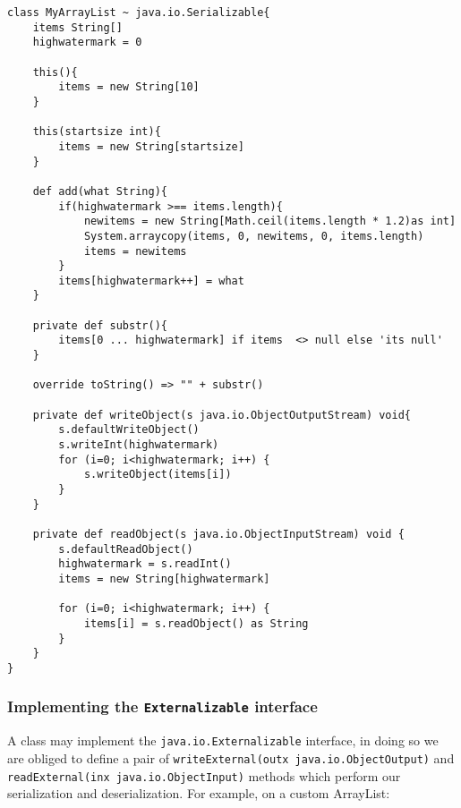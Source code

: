 \documentclass[conc-doc]{subfiles}
\begin{document}
\begin{lstlisting}
class MyArrayList ~ java.io.Serializable{
	items String[]
	highwatermark = 0
	
	this(){
		items = new String[10]
	}
	
	this(startsize int){
		items = new String[startsize]
	}
	
	def add(what String){
		if(highwatermark >== items.length){
			newitems = new String[Math.ceil(items.length * 1.2)as int]
			System.arraycopy(items, 0, newitems, 0, items.length)
			items = newitems
		}
		items[highwatermark++] = what
	}
	
	private def substr(){
		items[0 ... highwatermark] if items  <> null else 'its null'
	}
	
	override toString() => "" + substr()
	
	private def writeObject(s java.io.ObjectOutputStream) void{
		s.defaultWriteObject()
		s.writeInt(highwatermark)
		for (i=0; i<highwatermark; i++) {
			s.writeObject(items[i])
		}
	}
	
	private def readObject(s java.io.ObjectInputStream) void {
		s.defaultReadObject()
		highwatermark = s.readInt()
		items = new String[highwatermark] 
		
		for (i=0; i<highwatermark; i++) {
			items[i] = s.readObject() as String
		}
	}	
}
\end{lstlisting}

\subsubsection{Implementing the \lstinline{Externalizable} interface}
A class may implement the \lstinline{java.io.Externalizable} interface, in doing so we are obliged to define a pair of \lstinline{writeExternal(outx java.io.ObjectOutput)} and \lstinline{readExternal(inx java.io.ObjectInput)} methods which perform our serialization and deserialization. For example, on a custom ArrayList:
\end{document}
